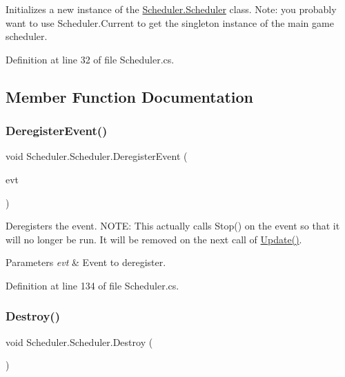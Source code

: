 Initializes a new instance of the \hyperlink{class_scheduler_1_1_scheduler}{Scheduler.\+Scheduler} class. Note\+: you probably want to use Scheduler.\+Current to get the singleton instance of the main game scheduler. 



Definition at line 32 of file Scheduler.\+cs.



\subsection{Member Function Documentation}
\mbox{\label{class_scheduler_1_1_scheduler_a7b069af9525b1f363465d99e916155ae}} 
\subsubsection{\texorpdfstring{Deregister\+Event()}{DeregisterEvent()}}
{\footnotesize\ttfamily void Scheduler.\+Scheduler.\+Deregister\+Event (\begin{DoxyParamCaption}\item[{\hyperlink{class_scheduler_1_1_scheduled_event}{Scheduled\+Event}}]{evt }\end{DoxyParamCaption})}



Deregisters the event. N\+O\+TE\+: This actually calls Stop() on the event so that it will no longer be run. It will be removed on the next call of \hyperlink{class_scheduler_1_1_scheduler_a9762a6e51fd4a109c4a89b718a5a8ce3}{Update()}. 


\begin{DoxyParams}{Parameters}
{\em evt} & Event to deregister.\\
\hline
\end{DoxyParams}


Definition at line 134 of file Scheduler.\+cs.

\mbox{\label{class_scheduler_1_1_scheduler_a2d598dd02e278c0fb25d473ae622229f}} 
\subsubsection{\texorpdfstring{Destroy()}{Destroy()}}
{\footnotesize\ttfamily void Scheduler.\+Scheduler.\+Destroy (\begin{DoxyParamCaption}{ }\end{DoxyParamCaption})}



